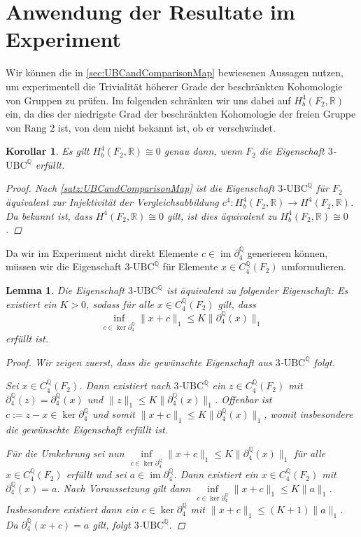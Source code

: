 \documentclass[a4paper,twoside,10pt]{scrreprt}
\DeclareMathOperator{\img}{im}
\newcommand{\Q}{\mathbb{Q}}
\newcommand{\R}{\mathbb{R}}
\newtheorem{lemma}[satz]{Lemma}
\newtheorem{korollar}[satz]{Korollar}
\theoremstyle{definition}
\begin{document}
\section{Anwendung der Resultate im Experiment}
Wir können die in \cref{sec:UBCandComparisonMap} bewiesenen Aussagen nutzen, um experimentell die Trivialität höherer Grade der beschränkten Kohomologie von Gruppen zu prüfen. Im folgenden schränken wir uns dabei auf $H_b^4(F_2,\R)$ ein, da dies der niedrigste Grad der beschränkten Kohomologie der freien Gruppe von Rang 2 ist, von dem nicht bekannt ist, ob er verschwindet.
\begin{korollar} 
Es gilt $H_b^4(F_2,\R)\cong 0$ genau dann, wenn $F_2$ die Eigenschaft $3$-$\text{UBC}^{\Q}$ erfüllt.
\begin{proof}
Nach \cref{satz:UBCandComparisonMap} ist die Eigenschaft $3$-$\text{UBC}^{\Q}$ für $F_2$ äquivalent zur Injektivität der Vergleichsabbildung $c^4:H_b^4(F_2,\R)\to H^4(F_2,\R)$. Da bekannt ist, dass $H^4(F_2,\R)\cong 0$ gilt, ist dies äquivalent zu $H_b^4(F_2,\R)\cong 0$.
\end{proof}
\end{korollar}
Da wir im Experiment nicht direkt Elemente $c\in\img\partial_4^{\Q}$ generieren können, müssen wir die Eigenschaft $3$-$\text{UBC}^{\Q}$ für Elemente $x\in C_4^{\Q}(F_2)$ umformulieren. 
\begin{lemma}\label{lem:AltQUBC}
Die Eigenschaft $3$-$\text{UBC}^{\Q}$ ist äquivalent zu folgender Eigenschaft:
Es existiert ein $K>0$, sodass für alle $x\in C_4^{\Q}(F_2)$ gilt, dass 
\begin{equation*}
\inf\limits_{c\in\ker\partial_4^{\Q}}\|x+c\|_1\leq K\|\partial_4^{\Q}(x)\|_1
\end{equation*}
erfüllt ist.
\begin{proof}
Wir zeigen zuerst, dass die gewünschte Eigenschaft aus $3$-$\text{UBC}^{\Q}$ folgt.\par
Sei $x\in C_4^{\Q}(F_2)$. Dann existiert nach $3$-$\text{UBC}^{\Q}$ ein $z\in C_4^{\Q}(F_2)$ mit $\partial_4^{\Q}(z)=\partial_4^{\Q}(x)$ und $\|z\|_1\leq K\|\partial_4^{\Q}(x)\|_1$. Offenbar ist $c:=z-x\in\ker\partial_4^{\Q}$ und somit $\|x+c\|_1\leq K\|\partial_4^{\Q}(x)\|_1$, womit insbesondere die gewünschte Eigenschaft erfüllt ist.\par
Für die Umkehrung sei nun $\inf\limits_{c\in\ker\partial_4^{\Q}}\|x+c\|_1\leq K\|\partial_4^{\Q}(x)\|_1$ für alle $x\in C_4^{\Q}(F_2)$ erfüllt und sei $a\in\img\partial_4^{\Q}$. Dann existiert ein $x\in C_4^{\Q}(F_2)$ mit $\partial_4^{\Q}(x)=a$.
Nach Voraussetzung gilt dann $\inf\limits_{c\in\ker\partial_4^{\Q}}\|x+c\|_1\leq K\|a\|_1$. Insbesondere existiert dann ein $c\in\ker\partial_4^{\Q}$ mit $\|x+c\|_1\leq (K+1)\|a\|_1$. Da $\partial_4^{\Q}(x+c)=a$ gilt, folgt $3$-$\text{UBC}^{\Q}$. 
\end{proof}
\end{lemma}
\end{document}
